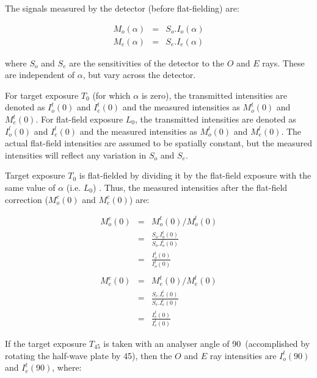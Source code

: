 The signals measured by the detector (before flat-fielding) are:

\begin{myquote}
\begin{eqnarray*}
  M_{o}(\alpha) & = & S_{o}.I_{o}(\alpha) \\
  M_{e}(\alpha) & = & S_{e}.I_{e}(\alpha) 
\end{eqnarray*}
\end{myquote}

where $S_{o}$ and $S_{e}$ are the sensitivities of the detector to the $O$ 
and $E$ rays. These are independent of $\alpha$, but vary across the
detector.

For target exposure $T_{0}$ (for which $\alpha$ is zero), the transmitted
intensities are denoted as $I^{t}_{o}(0)$ and $I^{t}_{e}(0)$ and the
measured intensities as $M^{t}_{o}(0)$ and $M^{t}_{e}(0)$. For flat-field
exposure $L_{0}$, the transmitted intensities are denoted as
$I^{l}_{o}(0)$ and $I^{l}_{e}(0)$ and the measured intensities as
$M^{l}_{o}(0)$ and $M^{l}_{e}(0)$. The actual flat-field intensities are
assumed to be spatially constant, but the measured intensities will
reflect any variation in $S_{o}$ and $S_{e}$.

Target exposure $T_{0}$ is flat-fielded by dividing it by the flat-field
exposure with the same value of $\alpha$ (i.e. $L_{0}$) . Thus, the
measured intensities after the flat-field correction ($M^{c}_{o}(0)$ and
$M^{c}_{e}(0)$) are:

\begin{myquote}
\begin{eqnarray*}
  M^{c}_{o}(0) & = & M^{t}_{o}(0) / M^{l}_{o}(0) \\
                    & = & \frac{ S_{o}.I^{t}_{o}(0) }{ S_{o}.I^{l}_{o}(0) } \\
                    & = & \frac{ I^{t}_{o}(0) }{ I^{l}_{o}(0) } \\ \\
  M^{c}_{e}(0) & = & M^{t}_{e}(0) / M^{l}_{e}(0) \\
                    & = & \frac{ S_{e}.I^{t}_{e}(0) }{ S_{e}.I^{l}_{e}(0) } \\
                    & = & \frac{ I^{t}_{e}(0) }{ I^{l}_{e}(0) } 
\end{eqnarray*}
\end{myquote}

If the target exposure $T_{45}$ is taken with an analyser angle 
of 90\dgs\ (accomplished by rotating the half-wave plate by 45\dgs), then
the $O$ and $E$ ray intensities are $I^{t}_{o}(90)$ and $I^{t}_{e}(90)$, where:

